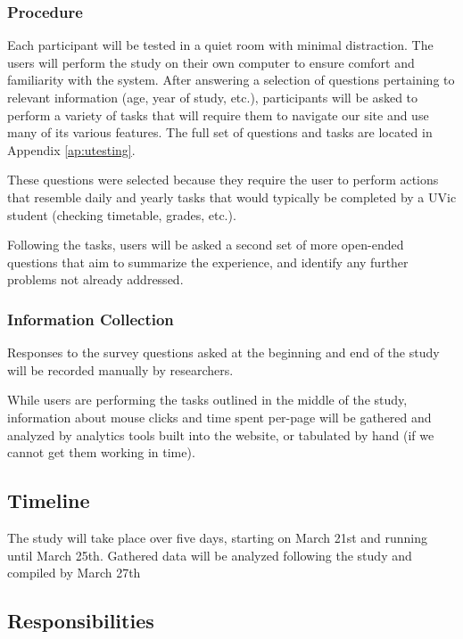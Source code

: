 \documentclass{article}
\begin{document}
\subsubsection{Procedure}

Each participant will be tested in a quiet room with minimal distraction. The users will perform the study on their own computer to ensure comfort and familiarity with the system. After answering a selection of questions pertaining to relevant information (age, year of study, etc.), participants will be asked to perform a variety of tasks that will require them to navigate our site and use many of its various features. The full set of questions and tasks are located in Appendix \ref{ap:utesting}.

These questions were selected because they require the user to perform actions that resemble daily and yearly tasks that would typically be completed by a UVic student (checking timetable, grades, etc.).

Following the tasks, users will be asked a second set of more open-ended questions that aim to summarize the experience, and identify any further problems not already addressed.

\subsubsection{Information Collection}

Responses to the survey questions asked at the beginning and end of the study will be recorded manually by researchers.

While users are performing the tasks outlined in the middle of the study, information about mouse clicks and time spent per-page will be gathered and analyzed by analytics tools built into the website, or tabulated by hand (if we cannot get them working in time).

\subsection{Timeline}

The study will take place over five days, starting on March 21st and running until March 25th. Gathered data will be analyzed following the study and compiled by March 27th

\subsection{Responsibilities}
\end{document}
